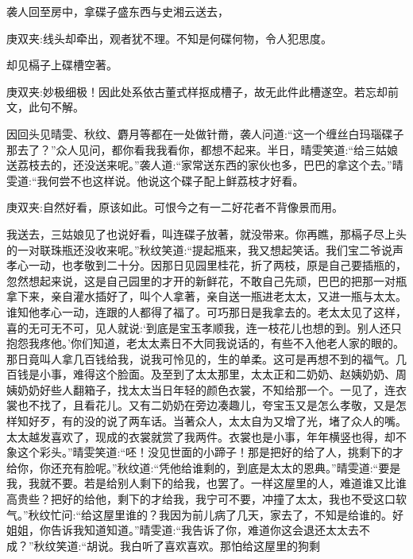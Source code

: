 \begin{parag}
    袭人回至房中，拿碟子盛东西与史湘云送去，\begin{note}庚双夹:线头却牵出，观者犹不理。不知是何碟何物，令人犯思度。\end{note}却见槅子上碟槽空著。\begin{note}庚双夹:妙极细极！因此处系依古董式样抠成槽子，故无此件此槽遂空。若忘却前文，此句不解。\end{note}因回头见晴雯、秋纹、麝月等都在一处做针黹，袭人问道:“这一个缠丝白玛瑙碟子那去了？”众人见问，都你看我我看你，都想不起来。半日，晴雯笑道:“给三姑娘送荔枝去的，还没送来呢。”袭人道:“家常送东西的家伙也多，巴巴的拿这个去。”晴雯道:“我何尝不也这样说。他说这个碟子配上鲜荔枝才好看。\begin{note}庚双夹:自然好看，原该如此。可恨今之有一二好花者不背像景而用。\end{note}我送去，三姑娘见了也说好看，叫连碟子放著，就没带来。你再瞧，那槅子尽上头的一对联珠瓶还没收来呢。”秋纹笑道:“提起瓶来，我又想起笑话。我们宝二爷说声孝心一动，也孝敬到二十分。因那日见园里桂花，折了两枝，原是自己要插瓶的，忽然想起来说，这是自己园里的才开的新鲜花，不敢自己先顽，巴巴的把那一对瓶拿下来，亲自灌水插好了，叫个人拿著，亲自送一瓶进老太太，又进一瓶与太太。谁知他孝心一动，连跟的人都得了福了。可巧那日是我拿去的。老太太见了这样，喜的无可无不可，见人就说:‘到底是宝玉孝顺我，连一枝花儿也想的到。别人还只抱怨我疼他。’你们知道，老太太素日不大同我说话的，有些不入他老人家的眼的。那日竟叫人拿几百钱给我，说我可怜见的，生的单柔。这可是再想不到的福气。几百钱是小事，难得这个脸面。及至到了太太那里，太太正和二奶奶、赵姨奶奶、周姨奶奶好些人翻箱子，找太太当日年轻的颜色衣裳，不知给那一个。一见了，连衣裳也不找了，且看花儿。又有二奶奶在旁边凑趣儿，夸宝玉又是怎么孝敬，又是怎样知好歹，有的没的说了两车话。当著众人，太太自为又增了光，堵了众人的嘴。太太越发喜欢了，现成的衣裳就赏了我两件。衣裳也是小事，年年横竖也得，却不象这个彩头。”晴雯笑道:“呸！没见世面的小蹄子！那是把好的给了人，挑剩下的才给你，你还充有脸呢。”秋纹道:“凭他给谁剩的，到底是太太的恩典。”晴雯道:“要是我，我就不要。若是给别人剩下的给我，也罢了。一样这屋里的人，难道谁又比谁高贵些？把好的给他，剩下的才给我，我宁可不要，冲撞了太太，我也不受这口软气。”秋纹忙问:“给这屋里谁的？我因为前儿病了几天，家去了，不知是给谁的。好姐姐，你告诉我知道知道。”晴雯道:“我告诉了你，难道你这会退还太太去不成？”秋纹笑道:“胡说。我白听了喜欢喜欢。那怕给这屋里的狗剩
\end{parag}
